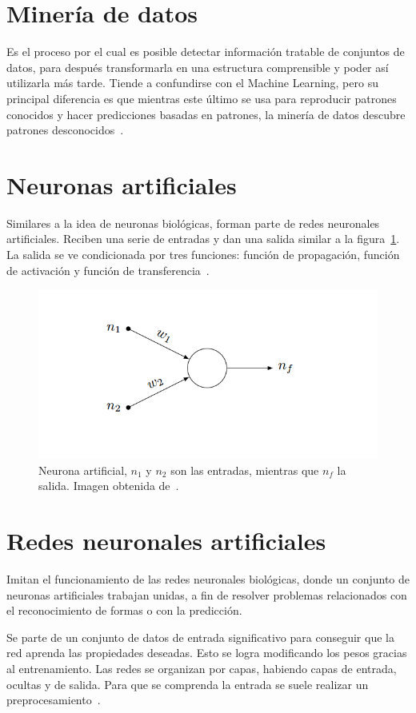 \section{Minería de datos} Es el proceso por el cual es posible detectar información tratable de conjuntos de datos, para después transformarla en una estructura comprensible y poder así utilizarla más tarde.
Tiende a confundirse con el Machine Learning, pero su principal diferencia es que mientras este último se usa para reproducir patrones conocidos y hacer predicciones basadas en patrones, la minería de datos descubre patrones desconocidos~\cite{mineria_datos}.

\section{Neuronas artificiales}
Similares a la idea de neuronas biológicas, forman parte de redes neuronales artificiales. Reciben una serie de entradas y dan una salida similar a la figura~\ref{fig:NeuArt}. La salida se ve condicionada por tres funciones: función de propagación, función de activación y función de transferencia~\cite{neurona_artificial}.

\begin{figure}
\centering
\includegraphics[width=.7\textwidth]{img/neurona_artificial}
\caption[Esquema de una neurona artificial]{Neurona artificial, $n_1$ y $n_2$ son las entradas, mientras que $n_f$ la salida. Imagen obtenida de~\cite{neurona_artificial}.}
\label{fig:NeuArt}
\end{figure}

\section{Redes neuronales artificiales}
Imitan el funcionamiento de las redes neuronales biológicas, donde un conjunto de neuronas artificiales trabajan unidas, a fin de resolver problemas relacionados con el reconocimiento de formas o con la predicción. 

Se parte de un conjunto de datos de entrada significativo para conseguir que la red aprenda las propiedades deseadas. Esto se logra modificando los pesos gracias al entrenamiento. Las redes se organizan por capas, habiendo capas de entrada, ocultas y de salida. Para que se comprenda la entrada se suele realizar un preprocesamiento~\cite{redes_neuronales}.

